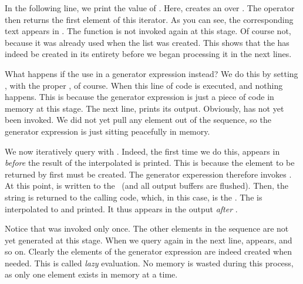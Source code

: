 In the following line, we print the value of .
Here,  creates an  over .
The  operator then returns the first element of this iterator.
As you can see, the corresponding text appears in .
The function  is not invoked again at this stage.
Of course not, because it was already used when the list was created.
This shows that the  has indeed be created in its entirety before we began processing it in the next lines.%
%
\begin{sloppypar}%
What happens if the use  in a generator expression instead?
We do this by setting , with the proper , of course.
When this line of code is executed, and nothing happens.
This is because the generator expression is just a piece of code in memory at this stage.
The next line,  prints its output.
Obviously,  has not yet been invoked.
We did not yet pull any element out of the sequence, so the generator expression is just sitting peacefully in memory.%
\end{sloppypar}%
%
We now iteratively query  with .
Indeed, the first time we do this,  appears in  \emph{before} the result of the interpolated   is printed.
This is because the element to be returned by  first must be created.
The generator experession therefore invokes .
At this point,  is written to the ~(and all output buffers are flushed).
Then, the string  is returned to the calling code, which, in this case, is the .
The  is interpolated to  and printed.
It thus appears in the output \emph{after} .

Notice that  was invoked only once.
The other elements in the sequence are not yet generated at this stage.
When we query  again in the next line,  appears, and so on.
Clearly the elements of the generator expression are indeed created when needed.
This is called \emph{lazy} evaluation.
No memory is wasted during this process, as only one element exists in memory at a time.


